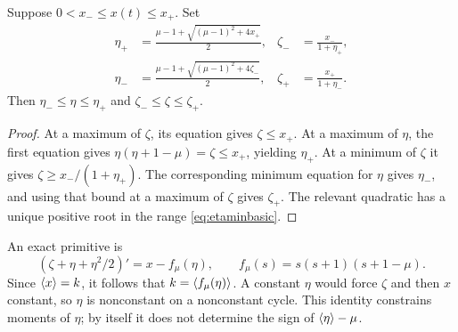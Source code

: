 \begin{lemma}\label{lem:projectivebounds}
Suppose $0<x_-\le x(t)\le x_+$. Set
\begin{align*}
\eta_+&=\frac{\mu-1+\sqrt{(\mu-1)^2+4x_+}}2,&
\zeta_-&=\frac{x_-}{1+\eta_+},\\
\eta_-&=\frac{\mu-1+\sqrt{(\mu-1)^2+4\zeta_-}}2,&
\zeta_+&=\frac{x_+}{1+\eta_-}.
\end{align*}
Then $\eta_-\le\eta\le\eta_+$ and $\zeta_-\le\zeta\le\zeta_+$.
\end{lemma}
\begin{proof}
At a maximum of $\zeta$, its equation gives $\zeta\le x_+$. At a maximum of $\eta$, the first equation gives $\eta(\eta+1-\mu)=\zeta\le x_+$, yielding $\eta_+$. At a minimum of $\zeta$ it gives $\zeta\ge x_-/(1+\eta_+)$. The corresponding minimum equation for $\eta$ gives $\eta_-$, and using that bound at a maximum of $\zeta$ gives $\zeta_+$. The relevant quadratic has a unique positive root in the range \eqref{eq:etaminbasic}.
\end{proof}

An exact primitive is
\begin{equation}\label{eq:gainprimitive}
(\zeta+\eta+\eta^2/2)'=x-f_\mu(\eta),\qquad
f_\mu(s)=s(s+1)(s+1-\mu).
\end{equation}
Since $\left\langle x\right\rangle=k$, it follows that $k=\left\langle f_\mu(\eta)\right\rangle$. A constant $\eta$ would force $\zeta$ and then $x$ constant, so $\eta$ is nonconstant on a nonconstant cycle. This identity constrains moments of $\eta$; by itself it does not determine the sign of $\left\langle \eta\right\rangle-\mu$.
